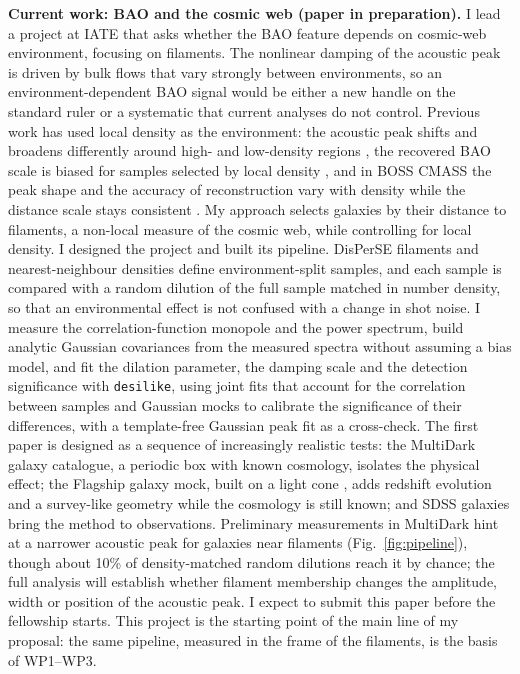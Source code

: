 \documentclass[11pt,a4paper]{article}
\newcommand{\desilike}{\texttt{desilike}}
\begin{document}
\textbf{Current work: BAO and the cosmic web (paper in preparation).} I lead a project at IATE that asks whether the BAO feature depends on cosmic-web environment, focusing on filaments. The nonlinear damping of the acoustic peak is driven by bulk flows that vary strongly between environments, so an environment-dependent BAO signal would be either a new handle on the standard ruler or a systematic that current analyses do not control. Previous work has used local density as the environment: the acoustic peak shifts and broadens differently around high- and low-density regions \citep{Neyrinck2018,Xu2025}, the recovered BAO scale is biased for samples selected by local density \citep{HernandezAguayo2020}, and in BOSS CMASS the peak shape and the accuracy of reconstruction vary with density while the distance scale stays consistent \citep{Blake2018}. My approach selects galaxies by their distance to filaments, a non-local measure of the cosmic web, while controlling for local density. I designed the project and built its pipeline. DisPerSE filaments \citep{Sousbie2011} and nearest-neighbour densities define environment-split samples, and each sample is compared with a random dilution of the full sample matched in number density, so that an environmental effect is not confused with a change in shot noise. I measure the correlation-function monopole and the power spectrum, build analytic Gaussian covariances from the measured spectra without assuming a bias model, and fit the dilation parameter, the damping scale and the detection significance with \desilike, using joint fits that account for the correlation between samples and Gaussian mocks to calibrate the significance of their differences, with a template-free Gaussian peak fit as a cross-check. The first paper is designed as a sequence of increasingly realistic tests: the MultiDark galaxy catalogue, a periodic box with known cosmology, isolates the physical effect; the Flagship galaxy mock, built on a light cone \citep{Castander2025}, adds redshift evolution and a survey-like geometry while the cosmology is still known; and SDSS galaxies bring the method to observations. Preliminary measurements in MultiDark hint at a narrower acoustic peak for galaxies near filaments (Fig.~\ref{fig:pipeline}), though about 10\% of density-matched random dilutions reach it by chance; the full analysis will establish whether filament membership changes the amplitude, width or position of the acoustic peak. I expect to submit this paper before the fellowship starts. This project is the starting point of the main line of my proposal: the same pipeline, measured in the frame of the filaments, is the basis of WP1--WP3.
\end{document}
